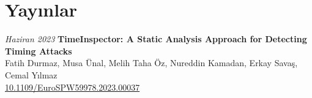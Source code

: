 \section{Yayınlar}

\begin{twocolentry}{
    \textit{Haziran 2023}}
    \textbf{TimeInspector: A Static Analysis Approach for Detecting Timing Attacks}\\
    \small Fatih Durmaz, Musa Ünal, Melih Taha Öz, Nureddin Kamadan, Erkay Savaş, Cemal Yılmaz\\
    \small \href{https://doi.org/10.1109/EuroSPW59978.2023.00037}{10.1109/EuroSPW59978.2023.00037}
\end{twocolentry}
